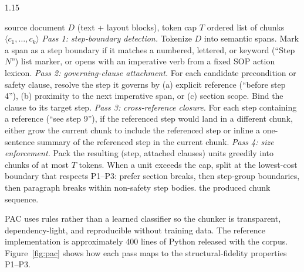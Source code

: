 \documentclass[make,article,submit,oneauthor,pdftex]{Definitions/mdpi}
\begin{document}
\begin{algorithm}[H]
\caption{Position-aware chunking (PAC).}
\label{alg:pac}
\begin{spacing}{1.15}
\begin{algorithmic}[1]
\Require source document $D$ (text + layout blocks), token cap $T$
\Ensure ordered list of chunks $\langle c_1,\dots,c_k\rangle$
\Statex
\State \emph{Pass 1: step-boundary detection.} Tokenize $D$ into
semantic spans. Mark a span as a step boundary if it matches a
numbered, lettered, or keyword (``Step $N$'') list marker, or opens
with an imperative verb from a fixed SOP action lexicon.
\Statex
\State \emph{Pass 2: governing-clause attachment.} For each candidate
precondition or safety clause, resolve the step it governs by (a)
explicit reference (``before step 4''), (b) proximity to the next
imperative span, or (c) section scope. Bind the clause to its target
step.
\Statex
\State \emph{Pass 3: cross-reference closure.} For each step containing
a reference (``see step 9''), if the referenced step would land in a
different chunk, either grow the current chunk to include the
referenced step or inline a one-sentence summary of the referenced
step in the current chunk.
\Statex
\State \emph{Pass 4: size enforcement.} Pack the resulting (step,
attached clauses) units greedily into chunks of at most $T$ tokens.
When a unit exceeds the cap, split at the lowest-cost boundary that
respects P1--P3: prefer section breaks, then step-group boundaries,
then paragraph breaks within non-safety step bodies.
\Statex
\State \Return the produced chunk sequence.
\end{algorithmic}
\end{spacing}
\end{algorithm}

PAC uses rules rather than a learned classifier so the chunker is
transparent, dependency-light, and reproducible without training data.
The reference implementation is approximately 400 lines of Python
released with the corpus. Figure~\ref{fig:pac} shows how each pass maps
to the structural-fidelity properties P1--P3.
\end{document}
